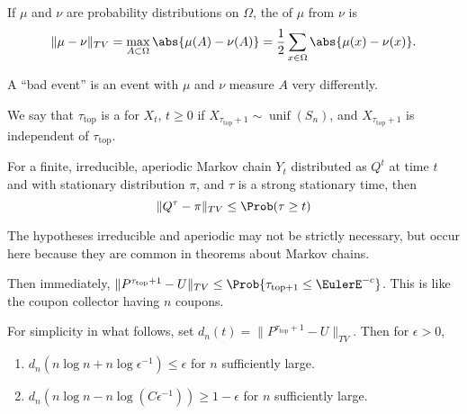 \documentclass[12pt]{article}
\begin{document}
\begin{definition}
    If \( \mu \) and \( \nu \) are probability distributions on \(
    \Omega \), the  of \( \mu \) from \(
    \nu \) is%
    \[
        \| \mu - \nu \|_{TV} = \max_{A \subset \Omega} \abs{ \mu(A) -
        \nu(A)} = \frac{1}{2} \sum\limits_{x \in \Omega} \abs{ \mu(x) -
        \nu(x)}.
    \]
\end{definition}

\begin{remark}
    A ``bad event'' is an event with \( \mu \) and \( \nu \) measure \(
    A \) very differently.
\end{remark}

\begin{definition}
    We say that \( \tau_{\text{top}} \) is a %
    for \( X_t \), \( t \ge 0 \) if \( X_{\tau_{\text{top}}+1} \sim
    \operatorname{unif}
    (S_n) \), and \( X_{\tau_{\text{top}}+1} \) is independent of \(
    \tau_{\text{top}} \).
\end{definition}

\begin{theorem}
    For a finite, irreducible, aperiodic Markov chain \( Y_t \)
    distributed as \( Q^t \) at time \( t \) and with stationary
    distribution \( \pi \), and \( \tau \) is a strong stationary time,
    then
    \[
        \| Q^{\tau} - \pi \|_{TV} \le \Prob(\tau \ge t)
    \]
\end{theorem}

\begin{remark}
    The hypotheses irreducible and aperiodic may not be strictly
    necessary, but occur here because they are common in theorems about
    Markov chains.
\end{remark}

Then immediately, \( \| P^{\tau_{\text{top}}+1} - U \|_{TV} \le \Prob{\tau_
{\text{top}+1} \le \EulerE^{-c}} \).  This is like the coupon collector
having \( n \) coupons.

For simplicity in what follows, set \( d_n(t) = \| P^{\tau_{\text{top}}+1}
- U \|_{TV} \).  Then for \( \epsilon > 0 \),
\begin{enumerate}
    \item
        \( d_{n}(n \log n + n \log \epsilon^{-1} )\le \epsilon \) for \(
        n \) sufficiently large.
    \item
        \( d_{n}(n \log n - n \log (C \epsilon^{-1})) \ge 1-\epsilon \)
        for \( n \) sufficiently large.
\end{enumerate}
\end{document}
